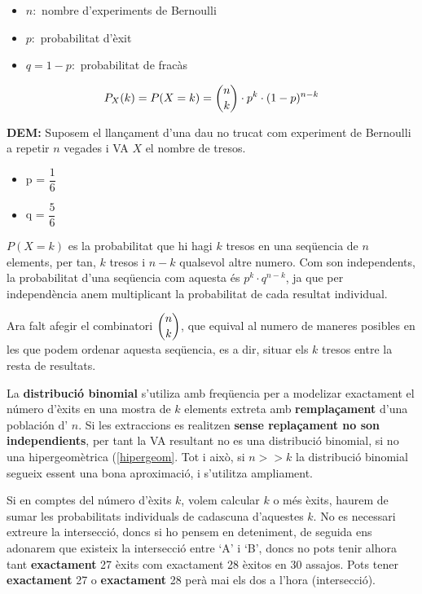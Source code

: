 \documentclass{article}
\newenvironment{blocktemplate}[1]{%
    \tcolorbox[beamer,%
    noparskip,breakable,
    colframe=Blue,%
    colbacklower=LimeGreen!75!LightGreen,%
    title=#1]}%
    {\endtcolorbox}
\newenvironment{blocktemplateI}[1]{%
    \tcolorbox[beamer,%
    noparskip,breakable,
    colframe=Violet,%
    colbacklower=Black,%
    title=#1]}%
    {\endtcolorbox}
\begin{document}
\begin{itemize}
    \item $n:$ nombre d'experiments de Bernoulli
    \item $p:$ probabilitat d'èxit
    \item $q = 1 - p:$ probabilitat de fracàs
\end{itemize}
\begin{align*}
    P_X(k) = P(X=k) = \dbinom{n}{k} \cdot p^k \cdot (1-p)^{n-k}
\end{align*}

\textbf{DEM:} Suposem el llançament d'una dau no trucat com experiment de Bernoulli a repetir $n$ vegades i VA $X$ el nombre de tresos.
\begin{itemize}
    \item p = $\dfrac{1}{6}$
    \item q = $\dfrac{5}{6}$
\end{itemize}
$P(X=k)$ es la probabilitat que hi hagi $k$ tresos en una seqüencia de $n$ elements, per tan, $k$ tresos i $n-k$ qualsevol altre numero. Com son independents, la probabilitat d'una seqüencia com aquesta és $p^k \cdot q^{n-k}$, ja que per independència anem multiplicant la probabilitat de cada resultat individual.

Ara falt afegir el combinatori $\dbinom{n}{k}$, que equival al numero de maneres posibles en les que podem ordenar aquesta seqüencia, es a dir, situar els $k$ tresos entre la resta de resultats.

\begin{blocktemplate}{NOTA}
La \textbf{distribució binomial} s'utiliza amb freqüencia per a modelizar exactament el número d'èxits en una mostra de $k$ elements extreta amb \textbf{remplaçament} d'una población d' $n$. Si les extraccions es realitzen \textbf{sense replaçament no son independients}, per tant la VA resultant no es una distribució binomial, si no una hipergeomètrica (\ref{hipergeom}. Tot i això, si $n >> k$ la distribució binomial segueix essent una bona aproximació, i s'utilitza ampliament.
\end{blocktemplate}

\begin{blocktemplateI}{NOTA 2}
Si en comptes del número d'èxits $k$, volem calcular $k$ o més èxits, haurem de sumar les probabilitats individuals de cadascuna d'aquestes $k$. No es necessari extreure la intersecció, doncs si ho pensem en deteniment, de seguida ens adonarem que existeix la intersecció entre `A' i `B', doncs no pots tenir alhora tant \textbf{exactament} 27 èxits com exactament 28 èxitos en 30 assajos. Pots tener \textbf{exactament} 27 o \textbf{exactament} 28 perà mai els dos a l'hora (intersecció).
\end{blocktemplateI}
\end{document}
